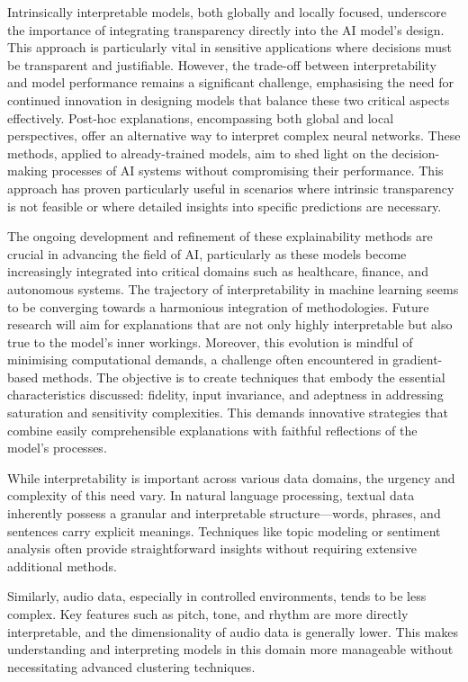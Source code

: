 Intrinsically interpretable models, both globally and locally focused, underscore the importance of integrating transparency directly into the AI model's design. This approach is particularly vital in sensitive applications where decisions must be transparent and justifiable. However, the trade-off between interpretability and model performance remains a significant challenge, emphasising the need for continued innovation in designing models that balance these two critical aspects effectively. Post-hoc explanations, encompassing both global and local perspectives, offer an alternative way to interpret complex neural networks. These methods, applied to already-trained models, aim to shed light on the decision-making processes of AI systems without compromising their performance. This approach has proven particularly useful in scenarios where intrinsic transparency is not feasible or where detailed insights into specific predictions are necessary.

The ongoing development and refinement of these explainability methods are crucial in advancing the field of AI, particularly as these models become increasingly integrated into critical domains such as healthcare, finance, and autonomous systems. The trajectory of interpretability in machine learning seems to be converging towards a harmonious integration of methodologies. Future research will aim for explanations that are not only highly interpretable but also true to the model's inner workings. Moreover, this evolution is mindful of minimising computational demands, a challenge often encountered in gradient-based methods. The objective is to create techniques that embody the essential characteristics discussed: fidelity, input invariance, and adeptness in addressing saturation and sensitivity complexities. This demands innovative strategies that combine easily comprehensible explanations with faithful reflections of the model’s processes.

While interpretability is important across various data domains, the urgency and complexity of this need vary. In natural language processing, textual data inherently possess a granular and interpretable structure—words, phrases, and sentences carry explicit meanings. Techniques like topic modeling or sentiment analysis often provide straightforward insights without requiring extensive additional methods.

Similarly, audio data, especially in controlled environments, tends to be less complex. Key features such as pitch, tone, and rhythm are more directly interpretable, and the dimensionality of audio data is generally lower. This makes understanding and interpreting models in this domain more manageable without necessitating advanced clustering techniques.

